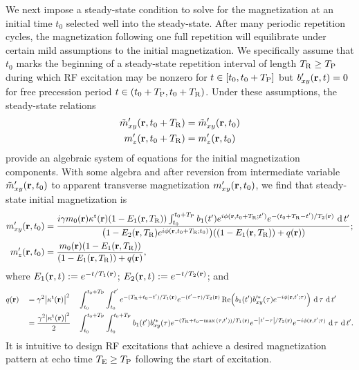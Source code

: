 We next impose a steady-state condition 
to solve for the magnetization
at an initial time $t_0$	
selected well into the steady-state.
After many periodic repetition cycles,
the magnetization following one full repetition will equilibrate
under certain mild assumptions \cite{scheffler:99:apd}
to the initial magnetization.
We specifically assume 
that $t_0$ marks the beginning
of a steady-state repetition interval of length $T_\mathrm{R}\geq T_\mathrm{P}$
during which RF excitation may be nonzero
for $t \in \brac{t_0,t_0+\TP}$ 
but $\bxyp\prt=0$ 
for free precession period $t \in \paren{t_0+\TP,t_0+\TR}$.
Under these assumptions,
the steady-state relations
\begin{align}
	\mxytp(\bmr, t_0+\TR) &= 
		\mxytp\prtz 
		\label{eq:ss-rf,mxyp-ss}
		\\
	\mzp(\bmr, t_0+\TR) &= 
		\mzp\prtz
		\label{eq:ss-rf,mzp-ss}
\end{align} 
provide an algebraic system of equations
for the initial magnetization components.
With some algebra
and after reversion from intermediate variable $\mxytp\prtz$
to apparent transverse magnetization $\mxyp\prtz$,
we find that steady-state initial magnetization is
\begin{align}
	\mxyp\prtz &= 
		\frac{%
			i \gam \mzero\pr \stx\pr (1-\EoR) \int_{t_0}^{t_0+\TP} \bone(t') 
				e^{i \phi(\bmr, t_0+\TR; t')} e^{-(t_0+\TR-t')/\Tt\pr} \der t'
		}{%
			\paren{1-\EtR e^{i \phi(\bmr, t_0 + \TR; t_0)}} \paren{(1-\EoR) + q\pr}
		};%
		\label{eq:ss-rf,mxyp-t0} 
		\\
	\mzp\prtz &= 
		\frac{%
			\mzero\pr \paren{1 - \EoR}
		}{%
			\paren{1-\EoR} + q\pr
		},%
	\label{eq:ss-rf,mzp-t0}
\end{align}
where $\Eo\prt := e^{-t/\To\pr}$;
$\Et\prt := e^{-t/\Tt\pr}$; 
and 
\begin{alignat}{3}
	&q\pr&
		&= \gam^2 \abs{\stx\pr}^2 
			&&\int_{t_0}^{t_0+\TP} \int_{t_0}^{t'} 
				e^{-(\TR + t_0 - t')/\To\pr} e^{-(t'-\tau)/\Tt\pr} 
				\re{\bone(t') b'^*_{xy}(\tau) e^{-i \phi(\bmr, t'; \tau)}} \der \tau \der t' 
				\nonumber \\
	& &
		&= \frac{\gam^2 \abs{\stx\pr}^2 }{2} 
			&&\int_{t_0}^{t_0+\TP} \int_{t_0}^{t_0+\TP} \bone(t') 
				b'^*_{xy}(\tau) e^{-(\TR + t_0 - \max{(\tau, t'))}/\To\pr} 
				e^{-\abs{t'-\tau}/\Tt\pr} e^{-i \phi(\bmr, t'; \tau)} \der \tau \der t'.
				\label{eq:ss-rf,q}
\end{alignat}
It is intuitive 
to design RF excitations 
that achieve a desired magnetization pattern 
at echo time $T_\mathrm{E}\geq T_\mathrm{P}$ 
following the start of excitation. 
